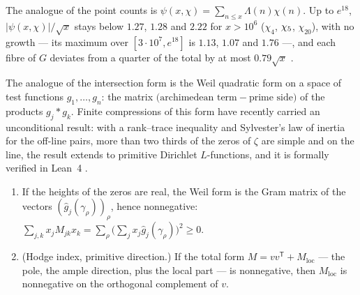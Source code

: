 The analogue of the point counts is $\psi(x,\chi)=\sum_{n\le x}\Lambda(n)\chi(n)$.  Up to $e^{18}$,
$|\psi(x,\chi)|/\sqrt x$ stays below $1.27$, $1.28$ and $2.22$ for $x>10^6$ ($\chi_4$, $\chi_5$,
$\chi_{20}$), with no growth --- its maximum over $[3\cdot10^7,e^{18}]$ is $1.13$, $1.07$ and $1.76$ ---,
and each fibre of $G$ deviates from a quarter of the total by at most $0.79\sqrt x$
.

The analogue of the intersection form is the Weil quadratic form on a space of test functions $g_1,\dots,g_n$: the matrix $\bigl(\text{archimedean term}-\text{prime side}\bigr)$ of the products $g_j*g_k$.  Finite compressions of this form have recently carried an unconditional result: with a rank--trace inequality and Sylvester's law of inertia for the off-line pairs, more than two thirds of the zeros of $\zeta$ are simple and on the line, the result extends to primitive Dirichlet $L$-functions, and it is formally verified in Lean~4 \cite{alpogefurman26}.

\begin{proposition}\label{prop:intersection-form}
\begin{enumerate}[label=\textup{(\roman*)}]
  \item If the heights of the zeros are real, the Weil form is the Gram matrix of the vectors
    $(\hat g_j(\gamma_\rho))_\rho$, hence nonnegative:
    $\sum_{j,k}x_jM_{jk}x_k=\sum_\rho\bigl(\sum_jx_j\hat g_j(\gamma_\rho)\bigr)^2\ge0$.
  \item (Hodge index, primitive direction.)  If the total form $M=vv^{\mathsf T}+M_{\mathrm{loc}}$ --- the
    pole, the ample direction, plus the local part --- is nonnegative, then $M_{\mathrm{loc}}$ is nonnegative
    on the orthogonal complement of $v$.
\end{enumerate}

\end{proposition}


